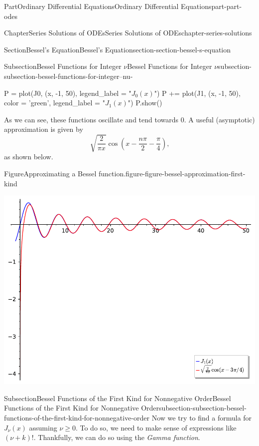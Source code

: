 \documentclass[twoside,10pt,]{book}
\numberwithin{equation}{part}
\begin{document}
\begin{partptx}{Part}{Ordinary Differential Equations}{}{Ordinary Differential Equations}{}{}{part-part-odes}
\begin{chapterptx}{Chapter}{Series Solutions of ODEs}{}{Series Solutions of ODEs}{}{}{chapter-series-solutions}
\begin{sectionptx}{Section}{Bessel's Equation}{}{Bessel's Equation}{}{}{section-section-bessel-s-equation}
\begin{subsectionptx}{Subsection}{Bessel Functions for Integer \(\nu\)}{}{Bessel Functions for Integer \(\nu\)}{}{}{subsection-subsection-bessel-functions-for-integer--nu-}
\begin{sageinput}
P = plot(J0, (x, -1, 50), legend_label = "$J_{0}(x)$")
P += plot(J1, (x, -1, 50), color = 'green', legend_label = "$J_{1}(x)$")
P.show()
\end{sageinput}
As we can see, these functions oscillate and tend towards \(0\). A useful (asymptotic) approximation is given by%
\begin{equation}
\sqrt{\frac{2}{\pi x}}\cos\left(x - \frac{n\pi}{2} - \frac{\pi}{4}\right)\text{,}\label{men-equation-bessel-asymptotic}
\end{equation}
as shown below.%
\begin{figureptx}{Figure}{Approximating a Bessel function.}{figure-figure-bessel-approximation-first-kind}{}%
\centering
\tcblower
\end{figureptx}%
\begin{image}{0}{1}{0}{}%
\includegraphics[width=\linewidth]{generated/sageplot/image-bessel-approximation-first-kind.pdf}%
\end{image}%
\end{subsectionptx}
%
%
\typeout{************************************************}
\typeout{************************************************}
%
\begin{subsectionptx}{Subsection}{Bessel Functions of the First Kind for Nonnegative Order}{}{Bessel Functions of the First Kind for Nonnegative Order}{}{}{subsection-subsection-bessel-functions-of-the-first-kind-for-nonnegative-order}
Now we try to find a formula for \(J_{\nu}(x)\) assuming \(\nu\geq0\). To do so, we need to make sense of expressions like \((\nu + k)!\). Thankfully, we can do so using the \emph{Gamma function}.%

\end{subsectionptx}
\end{sectionptx}
\end{chapterptx}
\end{partptx}
\end{document}
